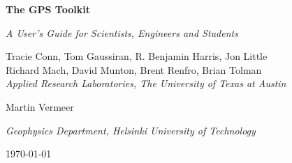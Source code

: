 
\begin{titlepage}

\begin{center}

\addvspace{30pt}


{ \Huge\bf The GPS Toolkit }

\addvspace{10pt}

{ \huge\it A User's Guide for Scientists, Engineers and Students }

\addvspace{60pt}

Tracie Conn, Tom Gaussiran, R. Benjamin Harris, Jon Little \\
Richard Mach, David Munton, Brent Renfro, Brian Tolman \\

\addvspace{3pt}
{ \it Applied Research Laboratories, The University of Texas at Austin}

\addvspace{10pt}

Martin Vermeer

\addvspace{3pt}
{ \it Geophysics Department, Helsinki University of Technology}

\addvspace{60pt}

\today


\end {center}

\end{titlepage}

